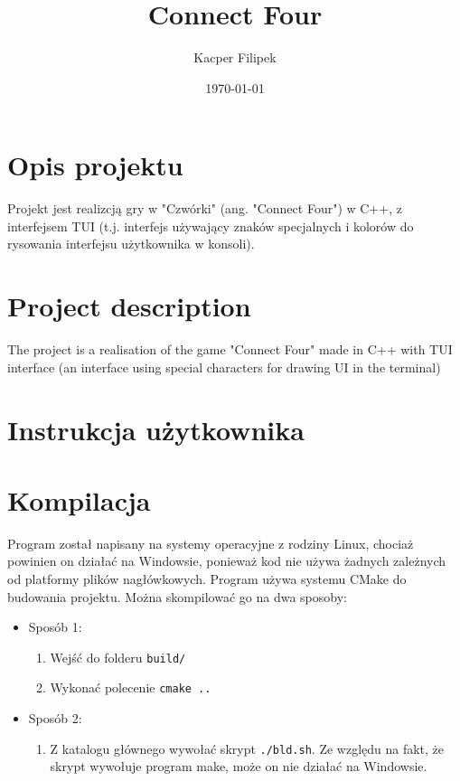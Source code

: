 \documentclass{article}
\title{Connect Four}
\author{Kacper Filipek}
\date{\today}
\begin{document}
\selectfont

\maketitle

\newpage

\section{Opis projektu}

Projekt jest realizcją gry w "Czwórki" (ang. "Connect Four") w C++, z interfejsem TUI (t.j. interfejs używający znaków specjalnych i kolorów do rysowania interfejsu użytkownika w konsoli). 

\section{Project description}

The project is a realisation of the game "Connect Four" made in C++ with TUI interface (an interface using special characters for drawing UI in the terminal)

\section{Instrukcja użytkownika}

\section{Kompilacja}

Program został napisany na systemy operacyjne z rodziny Linux, 
chociaż powinien on działać na Windowsie, ponieważ kod nie 
używa żadnych zależnych od platformy plików nagłówkowych. 
Program używa  systemu CMake do budowania projektu. 
Można skompilować go na dwa sposoby:
    \begin{itemize}
         
    \item Sposób 1:
        \begin{enumerate}
            \item Wejść do folderu \texttt{build/}
            \item Wykonać polecenie \texttt{cmake ..}
        \end{enumerate}

    \item Sposób 2:
        \begin{enumerate}
            \item Z katalogu głównego wywołać skrypt \texttt{./bld.sh}. Ze względu na fakt, że skrypt wywołuje program make, może on nie działać na Windowsie.
        \end{enumerate}

    \end{itemize}
\end{document}
